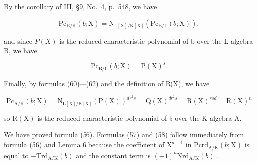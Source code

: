 By the corollary of III, §9, No.~4, p.~548, we have

\[
\mathrm{Pc} _ {\mathrm{B/K}} (b; \mathrm{X}) = \mathrm{N} _ {\mathrm{L[X] / K[X]}} (\mathrm{Pc} _ {\mathrm{B/L}} (b; \mathrm{X})),\tag{61}
\]

and since \(P(X)\) is the reduced characteristic polynomial of b over the L-algebra B, we have

\[
\mathrm{Pc} _ {\mathrm{B/L}} (b; \mathrm{X}) = \mathrm{P(X)} ^ {s}.\tag{62}
\]

Finally, by formulas (60)---(62) and the definition of R(X), we have

\[
\mathrm{Pc} _ {\mathrm{A/K}} (b; \mathrm{X}) = \mathrm{N} _ {\mathrm{L[X]/K[X]}} (\mathrm{P(X)}) ^ {d r ^ {2} s} = \mathrm{Q(X)} ^ {d r ^ {2} s} = \mathrm{R(X)} ^ {r s d} = \mathrm{R(X)} ^ {n}\tag{63}
\]

so \(\mathrm{R}(\mathrm{X})\) is the reduced characteristic polynomial of b over the K-algebra A.

We have proved formula (56). Formulas (57) and (58) follow immediately from formula (56) and Lemma 6 because the coefficient of \(\mathrm{X}^{n - 1}\) in \(\mathrm{Pcrd}_{\mathrm{A / K}}(b;\mathrm{X})\) is equal to \(-\mathrm{Trd}_{\mathrm{A / K}}(b)\) and the constant term is \((-1)^n\mathrm{Nrd}_{\mathrm{A / K}}(b)\) .

